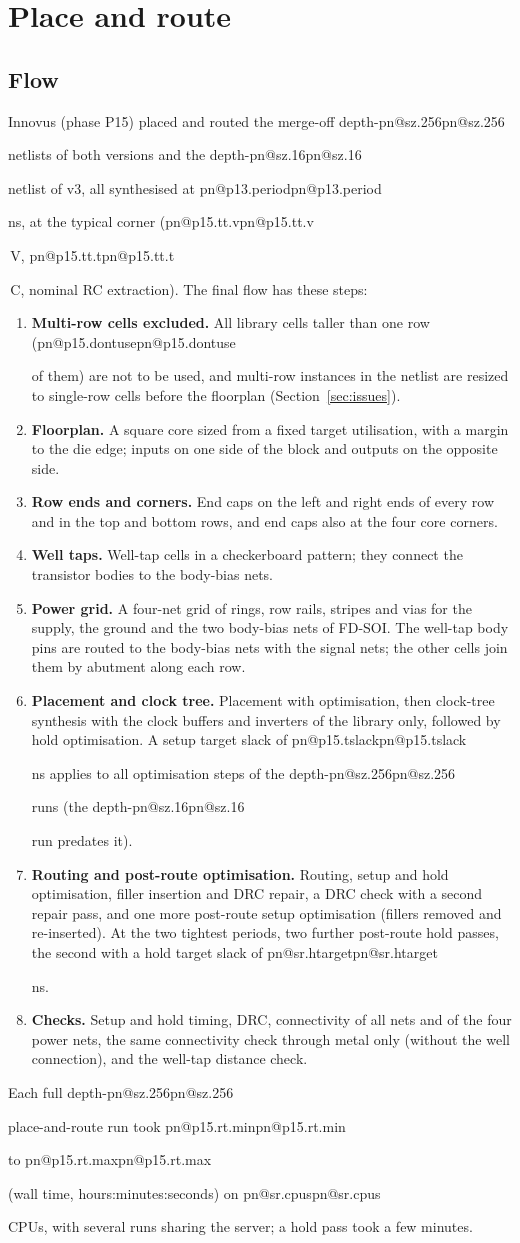 \documentclass[11pt,a4paper]{article}
\makeatletter
\DeclareRobustCommand{\R}[1]{\ifcsname pn@#1\endcsname\csname pn@#1\endcsname\else
  \PackageError{synthesis report}{number key '#1' is not defined in macros.tex}{Run tools/make_paper_macros.py --target synth}\fi}
\makeatother
\begin{document}
\section{Place and route}\label{sec:p15}
\subsection{Flow}
Innovus (phase P15) placed and routed the merge-off depth-\R{sz.256} netlists of both versions and the depth-\R{sz.16}
netlist of v3, all synthesised at \R{p13.period} ns, at the typical corner (\R{p15.tt.v}\,V, \R{p15.tt.t}\,\textdegree C,
nominal RC extraction). The final flow has these steps:
\begin{enumerate}
\item \textbf{Multi-row cells excluded.} All library cells taller than one row (\R{p15.dontuse} of them) are not to
be used, and multi-row instances in the netlist are resized to single-row cells before the floorplan
(Section~\ref{sec:issues}).
\item \textbf{Floorplan.} A square core sized from a fixed target utilisation, with a margin to the die edge; inputs on
one side of the block and outputs on the opposite side.
\item \textbf{Row ends and corners.} End caps on the left and right ends of every row and in the top and bottom rows,
and end caps also at the four core corners.
\item \textbf{Well taps.} Well-tap cells in a checkerboard pattern; they connect the transistor bodies to the
body-bias nets.
\item \textbf{Power grid.} A four-net grid of rings, row rails, stripes and vias for the supply, the ground and the
two body-bias nets of FD-SOI. The well-tap body pins are routed to the body-bias nets with the signal nets; the
other cells join them by abutment along each row.
\item \textbf{Placement and clock tree.} Placement with optimisation, then clock-tree synthesis with the clock
buffers and inverters of the library only, followed by hold optimisation. A setup target slack of \R{p15.tslack} ns
applies to all optimisation steps of the depth-\R{sz.256} runs (the depth-\R{sz.16} run predates it).
\item \textbf{Routing and post-route optimisation.} Routing, setup and hold optimisation, filler insertion and
DRC repair, a DRC check with a second repair pass, and one more post-route setup optimisation (fillers removed and
re-inserted). At the two tightest periods, two further post-route hold passes, the second with a hold target slack of
\R{sr.htarget} ns.
\item \textbf{Checks.} Setup and hold timing, DRC, connectivity of all nets and of the four power nets, the same
connectivity check through metal only (without the well connection), and the well-tap distance check.
\end{enumerate}
Each full depth-\R{sz.256} place-and-route run took \R{p15.rt.min} to \R{p15.rt.max} (wall time,
hours:minutes:seconds) on \R{sr.cpus} CPUs, with several runs sharing the server; a hold pass took a few minutes.
\end{document}
